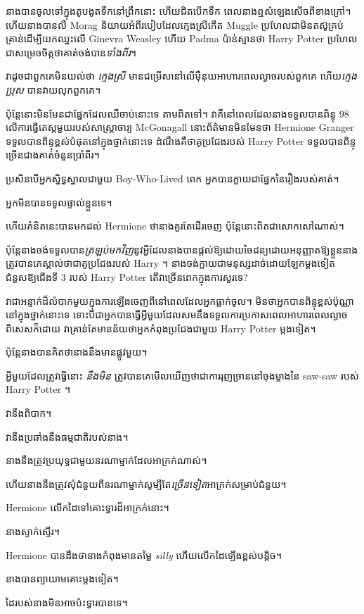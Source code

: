 នាង​បាន​ចូល​ទៅ​ក្នុង​តូប​ងូតទឹក​នៅ​ព្រឹក​នោះ ហើយ​ជិត​បើក​ទឹក ពេល​នាង​ឮ​សំឡេង​សើច​ពី​ខាង​ក្រៅ។ ហើយនាងបានលឺ Morag និយាយអំពីរបៀបដែលក្មេងស្រីកើត Muggle ប្រហែលជាមិនតស៊ូគ្រប់គ្រាន់ដើម្បីយកឈ្នះលើ Ginevra Weasley ហើយ Padma ប៉ាន់ស្មានថា Harry Potter ប្រហែលជាសម្រេចចិត្តថាគាត់ចង់បាន\emph{ទាំងពីរ}។

វាដូចជាពួកគេមិនយល់ថា \emph{ក្មេងស្រី} មានជម្រើសនៅលើម៉ឺនុយអាហារពេលល្ងាចរបស់ពួកគេ ហើយ\emph{ក្មេងប្រុស} បានវាយលុកពួកគេ។

ប៉ុន្តែនោះមិនមែនជាផ្នែកដែលឈឺចាប់នោះទេ តាមពិតទៅ។ វាគឺនៅពេលដែលនាងទទួលបានពិន្ទុ 98 លើការធ្វើតេស្តមួយរបស់សាស្រ្តាចារ្យ McGonagall នោះព័ត៌មានមិនមែនថា Hermione Granger ទទួលបានពិន្ទុខ្ពស់បំផុតនៅក្នុងថ្នាក់នោះទេ ដំណឹងគឺថាគូប្រជែងរបស់ Harry Potter ទទួលបានពិន្ទុច្រើនជាងគាត់ចំនួនប្រាំពីរ។

ប្រសិនបើអ្នកស្និទ្ធស្នាលជាមួយ Boy-Who-Lived ពេក អ្នកបានក្លាយជាផ្នែកនៃរឿងរបស់គាត់។

អ្នកមិនបានទទួលផ្ទាល់ខ្លួនទេ។

ហើយគំនិតនេះបានមកដល់ Hermione ថានាងគួរតែដើរចេញ ប៉ុន្តែនោះពិតជាសោកសៅណាស់។

ប៉ុន្តែនាងចង់ទទួលបាន\emph{ត្រឡប់មកវិញ}នូវអ្វីដែលនាងបានផ្តល់ឱ្យដោយចៃដន្យដោយអនុញ្ញាតឱ្យខ្លួននាងត្រូវបានគេស្គាល់ថាជាគូប្រជែងរបស់ Harry ។ នាងចង់ក្លាយជាមនុស្សដាច់ដោយឡែកម្តងទៀតជំនួសឱ្យជើងទី 3 របស់ Harry Potter តើវាច្រើនពេកក្នុងការសួរទេ?

វាជាអន្ទាក់ដ៏លំបាកមួយក្នុងការឡើងចេញពីនៅពេលដែលអ្នកធ្លាក់ចូល។ មិនថាអ្នកបានពិន្ទុខ្ពស់ប៉ុណ្ណានៅក្នុងថ្នាក់នោះទេ ទោះបីជាអ្នកបានធ្វើអ្វីមួយដែលសមនឹងទទួលការប្រកាសពេលអាហារពេលល្ងាចពិសេសក៏ដោយ វាគ្រាន់តែមានន័យថាអ្នកកំពុងប្រជែងជាមួយ Harry Potter ម្តងទៀត។

ប៉ុន្តែ​នាង​បាន​គិត​ថា​នាង​នឹង​មាន​ផ្លូវ​មួយ​។

អ្វីមួយដែលត្រូវធ្វើនោះ \emph{នឹងមិន} ត្រូវបានគេមើលឃើញថាជាការរុញច្រាននៅចុងម្ខាងនៃ saw-saw របស់ Harry Potter ។

វានឹងពិបាក។

វានឹងប្រឆាំងនឹងធម្មជាតិរបស់នាង។

នាងនឹងត្រូវប្រយុទ្ធជាមួយនរណាម្នាក់ដែលអាក្រក់ណាស់។

ហើយនាងនឹងត្រូវសុំជំនួយពីនរណាម្នាក់សូម្បីតែ\emph{ច្រើនទៀត}អាក្រក់សម្រាប់ជំនួយ។

Hermione លើកដៃទៅគោះទ្វារដ៏អាក្រក់នោះ។

នាងស្ទាក់ស្ទើរ។

Hermione បានដឹងថានាងកំពុងមានតម្លៃ \emph{silly} ហើយលើកដៃឡើងខ្ពស់បន្តិច។

នាងបានព្យាយាមគោះម្តងទៀត។

ដៃ​របស់​នាង​មិន​អាច​ប៉ះ​ទ្វារ​បាន​ទេ។

